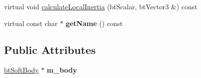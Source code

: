\begin{DoxyCompactItemize}
\item 
virtual void \hyperlink{classbt_soft_body_collision_shape_a2a3067c1010f95d4f0460499c57f736d}{calculate\+Local\+Inertia} (bt\+Scalar, bt\+Vector3 \&) const 
\item 
\hypertarget{classbt_soft_body_collision_shape_a0502bb8b15120381035821615452727f}{virtual const char $\ast$ {\bfseries get\+Name} () const }\label{classbt_soft_body_collision_shape_a0502bb8b15120381035821615452727f}

\end{DoxyCompactItemize}
\subsection*{Public Attributes}
\begin{DoxyCompactItemize}
\item 
\hypertarget{classbt_soft_body_collision_shape_a7f58131249a8200aaa86a569572ef4c2}{\hyperlink{classbt_soft_body}{bt\+Soft\+Body} $\ast$ {\bfseries m\+\_\+body}}\label{classbt_soft_body_collision_shape_a7f58131249a8200aaa86a569572ef4c2}

\end{DoxyCompactItemize}


